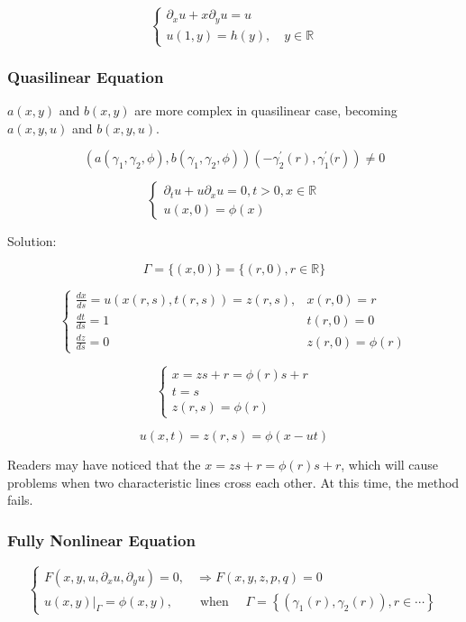 \begin{example}
$$
\left\{\begin{array}{l}{\partial_x u+x \partial_y u=u} \\ {u(1, y)=h(y),\quad y \in \mathbb{R}}\end{array}\right.
$$
\end{example}

\subsubsection{Quasilinear Equation}
$a(x,y)$ and $b(x,y)$ are more complex in quasilinear case, becoming $a(x,y,u)$ and $b(x,y,u)$.

$$
\left.\left(a\left(\gamma_{1}, \gamma_{2}, \phi\right), b\left(\gamma_{1}, \gamma_{2}, \phi\right)\right)\left(-\gamma_{2}^{\prime}(r), \gamma_{1}^{\prime}( r\right)\right) \neq 0
$$

\begin{example}
$$
\left\{\begin{array}{l}{\partial_t u+u \partial_x u=0, t>0, x\in\mathbb{R}} \\ {u(x,0)=\phi(x)}\end{array}\right.
$$

Solution:

$$
\Gamma=\{(x, 0)\}=\{(r, 0), r \in \mathbb{R}\}
$$

$$
\left\{\begin{array}{ll}{\frac{d x}{d s}=u(x(r, s), t(r, s))=z(r, s),} & {x(r, 0)=r} \\ {\frac{d t}{d s}=1} & {t(r, 0)=0} \\ {\frac{d z}{d s}=0} & {z(r, 0)=\phi(r)}\end{array}\right.
$$

$$
\left\{\begin{array}{l}{x=zs+r=\phi(r) s+r} \\ {t=s} \\ {z(r, s)=\phi(r)}\end{array}\right.
$$

$$
u(x, t)=z(r,s)=\phi(x-u t)
$$
\end{example}

Readers may have noticed that the $x=zs+r=\phi(r) s+r$, which will cause problems when two characteristic lines cross each other. At this time, the method fails.
\subsubsection{Fully Nonlinear Equation}
\begin{equation}
\left\{\begin{matrix}
F(x,y,u,\partial_x u,\partial_y u)=0, &\Longrightarrow F(x,y,z,p,q)=0 \\ 
\left.u(x, y)\right|_{\Gamma}=\phi(x, y), \quad &\text { when } \quad \Gamma=\left\{\left(\gamma_{1}(r), \gamma_{2}(r)\right), r \in \cdots\right\}
\end{matrix}\right.
\end{equation}

